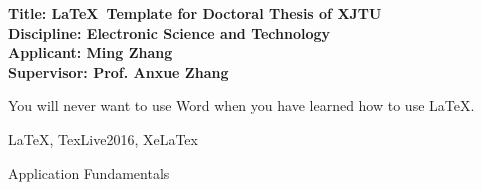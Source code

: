 \vskip-50mm
{\xiaosi\bfseries 
	\noindent Title: \LaTeX~Template for Doctoral Thesis of XJTU \\
	\noindent Discipline: Electronic Science and Technology \\
	\noindent Applicant: Ming Zhang \\
	\noindent Supervisor: Prof. Anxue Zhang
}
\vskip22mm

\noindent You will never want to use Word when you have learned how to use \LaTeX.

\vspace{\baselineskip}
 \LaTeX, TexLive2016, XeLaTex

\vspace{\baselineskip}
 Application Fundamentals

\titlespacing{\chapter}{0pt}{-5.3mm}{4.2mm}
\clearpage
